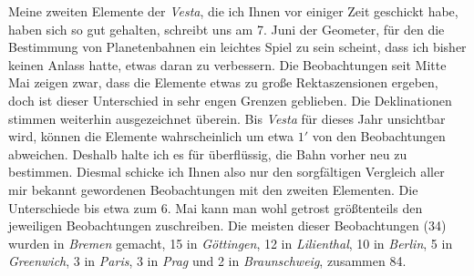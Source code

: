 \par\indent Meine zweiten Elemente der \emph{Vesta}, die ich Ihnen vor einiger Zeit geschickt habe, haben sich so gut gehalten, schreibt uns am 7. Juni der Geometer, für den die Bestimmung von Planetenbahnen ein leichtes Spiel zu sein scheint, dass ich bisher keinen Anlass hatte, etwas daran zu verbessern. Die Beobachtungen seit Mitte Mai zeigen zwar, dass die Elemente etwas zu große Rektaszensionen ergeben, doch ist dieser Unterschied in sehr engen Grenzen geblieben. Die Deklinationen stimmen weiterhin ausgezeichnet überein. Bis \emph{Vesta} für dieses Jahr unsichtbar wird, können die Elemente wahrscheinlich um etwa $1'$ von den Beobachtungen abweichen. Deshalb halte ich es für überflüssig, die Bahn vorher neu zu bestimmen. Diesmal schicke ich Ihnen also nur den sorgfältigen Vergleich aller mir bekannt gewordenen Beobachtungen mit den zweiten Elementen. Die Unterschiede bis etwa zum 6. Mai kann man wohl getrost größtenteils den jeweiligen Beobachtungen zuschreiben. Die meisten dieser Beobachtungen (34) wurden in \emph{Bremen} gemacht, 15 in \emph{Göttingen}, 12 in \emph{Lilienthal}, 10 in \emph{Berlin}, 5 in \emph{Greenwich}, 3 in \emph{Paris}, 3 in \emph{Prag} und 2 in \emph{Braunschweig}, zusammen 84.
\clearpage
\begingroup
\fontsize{9}{11}\selectfont
\setlength{\tabcolsep}{2.5pt}\renewcommand{\arraystretch}{1.10}
